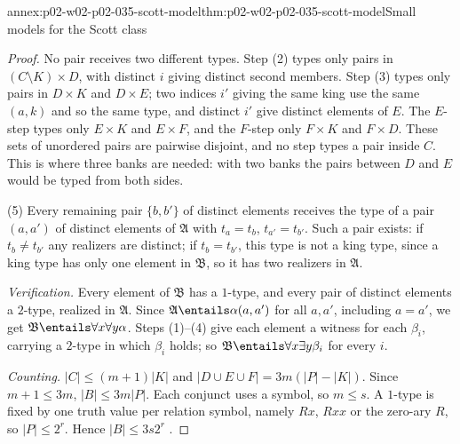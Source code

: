 \begin{annexitem}{annex:p02-w02-p02-035-scott-model}{thm:p02-w02-p02-035-scott-model}{Small models for the Scott class}
\begin{proof}
No pair receives two different types.  Step (2) types only pairs in
\((C\setminus K)\times D\), with distinct \(i\) giving distinct second
members.  Step (3) types only pairs in \(D\times K\) and \(D\times E\); two
indices \(i'\) giving the same king use the same \((a,k)\) and so the same
type, and distinct \(i'\) give distinct elements of \(E\).  The \(E\)-step
types only \(E\times K\) and \(E\times F\), and the \(F\)-step only \(F\times
K\) and \(F\times D\).  These sets of unordered pairs are pairwise disjoint,
and no step types a pair inside \(C\).  This is where three banks are needed:
with two banks the pairs between \(D\) and \(E\) would be typed from both
sides.

(5) Every remaining pair \(\{b,b'\}\) of distinct elements receives the type
of a pair \((a,a')\) of distinct elements of \(\mathfrak A\) with
\(t_a=t_b\), \(t_{a'}=t_{b'}\).  Such a pair exists: if \(t_b\neq t_{b'}\) any
realizers are distinct; if \(t_b=t_{b'}\), this type is not a king type,
since a king type has only one element in \(\mathfrak B\), so it has two
realizers in \(\mathfrak A\).

\emph{Verification.}  Every element of \(\mathfrak B\) has a \(1\)-type, and
every pair of distinct elements a \(2\)-type, realized in \(\mathfrak A\).
Since \(\mathfrak A\entails\alpha(a,a')\) for all \(a,a'\), including
\(a=a'\), we get \(\mathfrak B\entails\forall x\forall y\alpha\).  Steps
(1)--(4) give each element a witness for each \(\beta_i\), carrying a
\(2\)-type in which \(\beta_i\) holds; so \(\mathfrak B\entails\forall
x\exists y\beta_i\) for every \(i\).

\emph{Counting.}  \(\lvert C\rvert\leq(m+1)\lvert K\rvert\) and
\(\lvert D\cup E\cup F\rvert=3m(\lvert P\rvert-\lvert K\rvert)\).  Since
\(m+1\leq3m\), \(\lvert B\rvert\leq3m\lvert P\rvert\).  Each conjunct uses a
symbol, so \(m\leq s\).  A \(1\)-type is fixed by one truth value per relation
symbol, namely \(Rx\), \(Rxx\) or the zero-ary \(R\), so
\(\lvert P\rvert\leq2^r\).  Hence \(\lvert B\rvert\leq3s2^r\)
\cite[proof of thm.~4.3]{GradelKolaitisVardi1997}.
\end{proof}
\end{annexitem}

